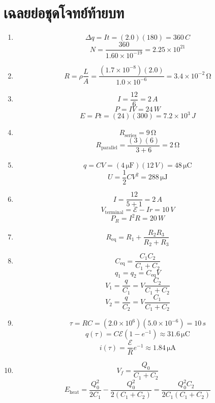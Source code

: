 \section{เฉลยย่อชุดโจทย์ท้ายบท}

\begin{enumerate}
    \item
    \[
    \Delta q=It=(2.0)(180)=360\,\si{C}
    \]
    \[
    N=\frac{360}{1.60\times10^{-19}}
    =2.25\times10^{21}
    \]

    \item
    \[
    R=\rho\frac{L}{A}
    =\frac{(1.7\times10^{-8})(2.0)}{1.0\times10^{-6}}
    =3.4\times10^{-2}\,\si{\ohm}
    \]

    \item
    \[
    I=\frac{12}{6}=2\,\si{A}
    \]
    \[
    P=IV=24\,\si{W}
    \]
    \[
    E=Pt=(24)(300)=7.2\times10^3\,\si{J}
    \]

    \item
    \[
    R_{\text{series}}=9\,\si{\ohm}
    \]
    \[
    R_{\text{parallel}}=\frac{(3)(6)}{3+6}=2\,\si{\ohm}
    \]

    \item
    \[
    q=CV=(4\,\si{\micro\farad})(12\,\si{V})
    =48\,\si{\micro\coulomb}
    \]
    \[
    U=\frac12CV^2=288\,\si{\micro\joule}
    \]

    \item
    \[
    I=\frac{12}{5+1}=2\,\si{A}
    \]
    \[
    V_{\text{terminal}}=\mathcal{E}-Ir=10\,\si{V}
    \]
    \[
    P_R=I^2R=20\,\si{W}
    \]

    \item
    \[
    R_{\text{eq}}=R_1+\frac{R_2R_3}{R_2+R_3}
    \]

    \item
    \[
    C_{\text{eq}}=\frac{C_1C_2}{C_1+C_2}
    \]
    \[
    q_1=q_2=C_{\text{eq}}V
    \]
    \[
    V_1=\frac{q}{C_1}=V\frac{C_2}{C_1+C_2}
    \]
    \[
    V_2=\frac{q}{C_2}=V\frac{C_1}{C_1+C_2}
    \]

    \item
    \[
    \tau=RC=(2.0\times10^6)(5.0\times10^{-6})=10\,\si{s}
    \]
    \[
    q(\tau)=C\mathcal{E}(1-e^{-1})
    \approx31.6\,\si{\micro\coulomb}
    \]
    \[
    i(\tau)=\frac{\mathcal{E}}{R}e^{-1}
    \approx1.84\,\si{\micro\ampere}
    \]

    \item
    \[
    V_f=\frac{Q_0}{C_1+C_2}
    \]
    \[
    E_{\text{heat}}
    =\frac{Q_0^2}{2C_1}
    -\frac{Q_0^2}{2(C_1+C_2)}
    =\frac{Q_0^2C_2}{2C_1(C_1+C_2)}
    \]


\end{enumerate}
